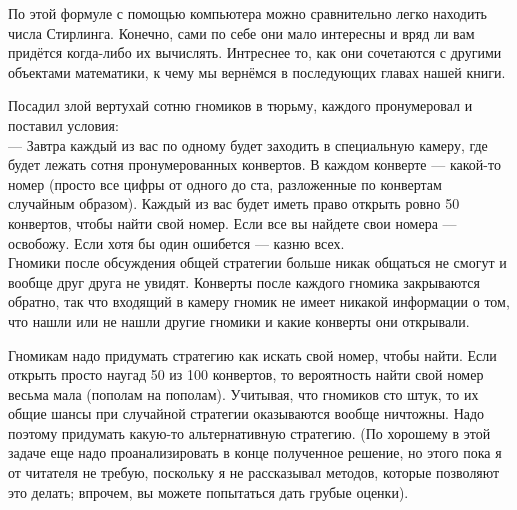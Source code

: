 По этой формуле с помощью компьютера можно сравнительно легко находить числа Стирлинга. Конечно, сами по себе они мало интересны и вряд ли вам придётся когда-либо их вычислять. Интреснее то, как они сочетаются с другими объектами математики, к чему мы вернёмся в последующих главах нашей книги.

\begin{exercise}
Посадил злой вертухай сотню гномиков в тюрьму, каждого пронумеровал и поставил условия:\\
— Завтра каждый из вас по одному будет заходить в специальную камеру, где будет лежать сотня пронумерованных конвертов. В каждом конверте — какой-то номер (просто все цифры от одного до ста, разложенные по конвертам случайным образом). Каждый из вас будет иметь право открыть ровно 50 конвертов, чтобы найти свой номер. Если все вы найдете свои номера — освобожу. Если хотя бы один ошибется — казню всех.\\
Гномики после обсуждения общей стратегии больше никак общаться не смогут и вообще друг друга не увидят. Конверты после каждого гномика закрываются обратно, так что входящий в камеру гномик не имеет никакой информации о том, что нашли или не нашли другие гномики и какие конверты они открывали.

Гномикам надо придумать стратегию как искать свой номер, чтобы найти. Если открыть просто наугад 50 из 100 конвертов, то вероятность найти свой номер весьма мала (пополам на пополам). Учитывая, что гномиков сто штук, то их общие шансы при случайной стратегии оказываются вообще ничтожны. Надо поэтому придумать какую-то альтернативную стратегию. (По хорошему в этой задаче еще надо проанализировать в конце полученное решение, но этого пока я от читателя не требую, поскольку я не рассказывал методов, которые позволяют это делать; впрочем, вы можете попытаться дать грубые оценки).
\end{exercise}
